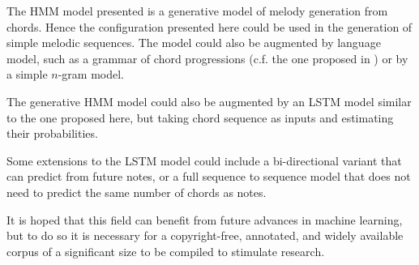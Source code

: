 \documentclass[bsc,singlespacing,logo, parskip, deptreport]{infthesis}
\begin{document}
The HMM model presented is a generative model of melody generation from chords. Hence the configuration presented here could be used in the generation of simple melodic sequences. The model could also be augmented by language model, such as a grammar of chord progressions (c.f. the one proposed in \cite{steedman1984generative}) or by a simple $n$-gram model.

The generative HMM model could also be augmented by an LSTM model similar to the one proposed here, but taking chord sequence as inputs and estimating their probabilities.

Some extensions to the LSTM model could include a bi-directional variant that can predict from future notes, or a full sequence to sequence model that does not need to predict the same number of chords as notes.

It is hoped that this field can benefit from future advances in machine learning, but to do so it is necessary for a copyright-free, annotated, and widely available corpus of a significant size to be compiled to stimulate research.



\end{document}
